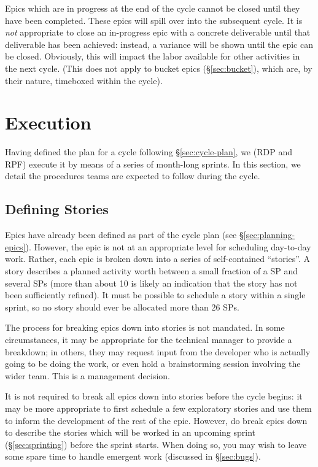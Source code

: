 Epics which are in progress at the end of the \gls{cycle} cannot be closed until they have been completed.
These \glspl{epic} will spill over into the subsequent \gls{cycle}.
It is \emph{not} appropriate to close an in-progress \gls{epic} with a concrete deliverable until that deliverable has been achieved: instead, a variance will be shown until the \gls{epic} can be closed.
Obviously, this will impact the labor available for other activities in the next \gls{cycle}.
(This does not apply to bucket \glspl{epic} (\S\ref{sec:bucket}), which are, by their nature, \gls{timebox}ed within the \gls{cycle}).


\section{Execution} \label{sec:execution}

Having defined the plan for a \gls{cycle} following \S\ref{sec:cycle-plan}, we (RDP and RPF) execute it by means of a series of month-long sprints.
In this section, we detail the procedures teams are expected to follow during the \gls{cycle}.

\subsection{Defining Stories}
\label{sec:defining-stories}

Epics have already been defined as part of the \gls{cycle} plan (see \S\ref{sec:planning-epics}).
However, the \gls{epic} is not at an appropriate level for scheduling day-to-day work.
Rather, each \gls{epic} is broken down into a series of self-contained ``stories''.
A \gls{story} describes a planned activity worth between a small fraction of a SP and several \glspl{SP} (more than about 10 is likely an indication that the \gls{story} has not been sufficiently refined).
It must be possible to schedule a \gls{story} within a single sprint, so no \gls{story} should ever be allocated more than 26 \glspl{SP}.

The process for breaking \glspl{epic} down into stories is not mandated. In
some circumstances, it may be appropriate for the technical manager to
provide a breakdown; in others, they may request input from the
developer who is actually going to be doing the work, or even hold a
brainstorming session involving the wider team. This is a management
decision.

It is not required to break all \glspl{epic} down into stories before the \gls{cycle} begins: it may be more appropriate to first schedule a few exploratory stories and use them to inform the development of the rest of the \gls{epic}.
However, do break \glspl{epic} down to describe the stories which will be worked in an upcoming sprint (\S\ref{sec:sprinting}) before the sprint starts.
When doing so, you may wish to leave some spare time to handle emergent work (discussed in \S\ref{sec:bugs}).

